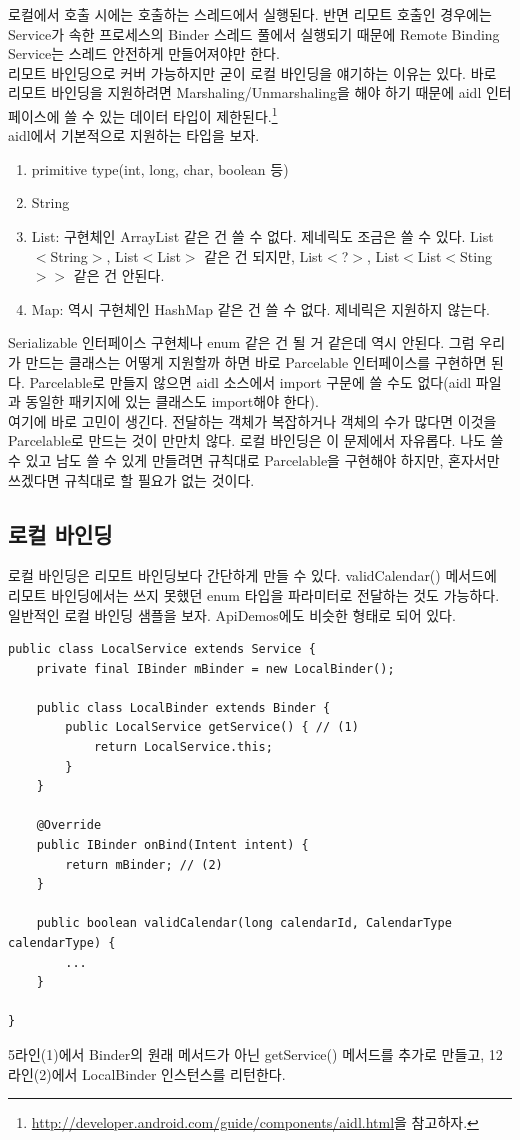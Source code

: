 로컬에서 호출 시에는 호출하는 스레드에서 실행된다. 
반면 리모트 호출인 경우에는 Service가 속한 프로세스의 Binder 스레드 풀에서 실행되기 때문에 Remote Binding Service는 스레드 안전하게 만들어져야만 한다.\\

리모트 바인딩으로 커버 가능하지만 굳이 로컬 바인딩을 얘기하는 이유는 있다. 
바로 리모트 바인딩을 지원하려면 Marshaling/Unmarshaling을 해야 하기 때문에 
aidl 인터페이스에 쓸 수 있는 데이터 타입이 제한된다.\footnote{\url{http://developer.android.com/guide/components/aidl.html}을 참고하자.}\\

aidl에서 기본적으로 지원하는 타입을 보자. 
\begin{enumerate}
\item primitive type(int, long, char, boolean 등)
\item String
\item List: 구현체인 ArrayList 같은 건 쓸 수 없다. 제네릭도 조금은 쓸 수 있다. List$<$String$>$, List$<$List$>$ 같은 건 되지만, List$<$?$>$, List$<$List$<$Sting$>>$ 같은 건 안된다.
\item Map: 역시 구현체인 HashMap 같은 건 쓸 수 없다. 제네릭은 지원하지 않는다.
\end{enumerate}
Serializable 인터페이스 구현체나 enum 같은 건 될 거 같은데 역시 안된다.
그럼 우리가 만드는 클래스는 어떻게 지원할까 하면 바로 Parcelable 인터페이스를 구현하면 된다. 
Parcelable로 만들지 않으면 aidl 소스에서 import 구문에 쓸 수도 없다(aidl 파일과 동일한 패키지에 있는 클래스도 import해야 한다).\\

여기에 바로 고민이 생긴다. 전달하는 객체가 복잡하거나 객체의 수가 많다면 이것을 Parcelable로 만드는 것이 만만치 않다.
로컬 바인딩은 이 문제에서 자유롭다. 나도 쓸 수 있고 남도 쓸 수 있게 만들려면 규칙대로 Parcelable을 구현해야 하지만, 혼자서만 쓰겠다면 규칙대로 할 필요가 없는 것이다.\\

\subsection{로컬 바인딩}
로컬 바인딩은 리모트 바인딩보다 간단하게 만들 수 있다.
validCalendar() 메서드에 리모트 바인딩에서는 쓰지 못했던 enum 타입을 파라미터로 전달하는 것도 가능하다. 
일반적인 로컬 바인딩 샘플을 보자. ApiDemos에도 비슷한 형태로 되어 있다.
\begin{lstlisting}[frame=single]
public class LocalService extends Service {
	private final IBinder mBinder = new LocalBinder();

	public class LocalBinder extends Binder {
		public LocalService getService() { // (1)
			return LocalService.this;
		}
	}

	@Override
	public IBinder onBind(Intent intent) {
		return mBinder; // (2)
	}

	public boolean validCalendar(long calendarId, CalendarType calendarType) {
		...
	}

}
\end{lstlisting}
5라인(1)에서 Binder의 원래 메서드가 아닌 getService() 메서드를 추가로 만들고, 12라인(2)에서 LocalBinder 인스턴스를 리턴한다.\\


